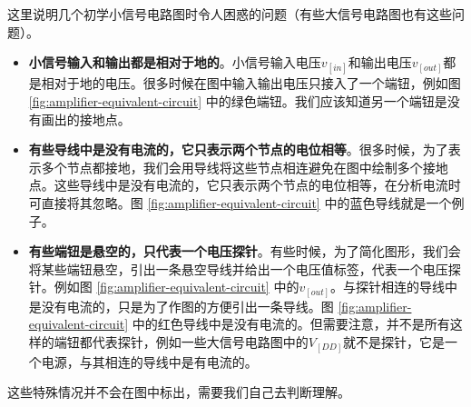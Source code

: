 这里说明几个初学小信号电路图时令人困惑的问题（有些大信号电路图也有这些问题）。
\begin{itemize}
    \item \textbf{小信号输入和输出都是相对于地的}。小信号输入电压$v_[in]$和输出电压$v_[out]$都是相对于地的电压。很多时候在图中输入输出电压只接入了一个端钮，例如图 \ref{fig:amplifier-equivalent-circuit} 中的绿色端钮。我们应该知道另一个端钮是没有画出的接地点。

    \item \textbf{有些导线中是没有电流的，它只表示两个节点的电位相等}。很多时候，为了表示多个节点都接地，我们会用导线将这些节点相连避免在图中绘制多个接地点。这些导线中是没有电流的，它只表示两个节点的电位相等，在分析电流时可直接将其忽略。图 \ref{fig:amplifier-equivalent-circuit} 中的蓝色导线就是一个例子。

    \item \textbf{有些端钮是悬空的，只代表一个电压探针}。有些时候，为了简化图形，我们会将某些端钮悬空，引出一条悬空导线并给出一个电压值标签，代表一个电压探针。例如图 \ref{fig:amplifier-equivalent-circuit} 中的$v_[out]$。与探针相连的导线中是没有电流的，只是为了作图的方便引出一条导线。图 \ref{fig:amplifier-equivalent-circuit} 中的红色导线中是没有电流的。但需要注意，并不是所有这样的端钮都代表探针，例如一些大信号电路图中的$V_[DD]$就不是探针，它是一个电源，与其相连的导线中是有电流的。
\end{itemize}
这些特殊情况并不会在图中标出，需要我们自己去判断理解。

